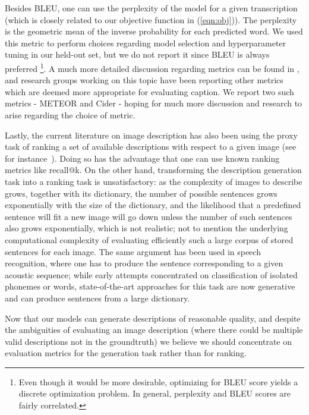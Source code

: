 Besides BLEU, one can use the perplexity of the model for a given transcription
(which is closely related to our objective function in (\ref{eqn:obj})). The perplexity
is the geometric mean of the inverse probability for each predicted word. We
used this metric to perform choices regarding model selection and hyperparameter
tuning in our held-out set, but we do not report it since BLEU is always preferred
\footnote{Even though it would be more desirable, optimizing for BLEU score yields
a discrete optimization problem. In general, perplexity and BLEU scores are fairly
correlated.}. A much more detailed discussion regarding metrics can be found in
\cite{cider}, and research groups working on this topic have been reporting
other metrics which are deemed more appropriate for evaluating caption. We report
two such metrics - METEOR and Cider - hoping for much more discussion and research
to arise regarding the choice of metric.

Lastly, the current literature on image description
has also been using the proxy task of ranking a set of available
descriptions with respect to a given image (see for instance~\cite{kiros2014}).
Doing so has the advantage that one can use known ranking metrics like recall@k.
On the other hand, transforming the description generation task into a ranking
task is unsatisfactory: as the complexity of images to describe grows, together
with its dictionary, the number of possible sentences grows exponentially with
the size of the dictionary, and
the likelihood that a predefined sentence will fit a new image will go down
unless the number of such sentences also grows exponentially, which is not
realistic; not to mention the underlying computational complexity of evaluating
efficiently such a large corpus of stored sentences for each image.
The same argument has been used in speech recognition, where one has to
produce the sentence corresponding to a given acoustic sequence; while early
attempts concentrated on classification of isolated phonemes or words,
state-of-the-art approaches for this task are now generative and can produce
sentences from a large dictionary.

Now that our models can generate descriptions of reasonable quality,
and despite the ambiguities of evaluating an image description (where there
could be multiple valid descriptions not in the groundtruth)
we believe we should concentrate on evaluation metrics for the generation task
rather than for ranking.

